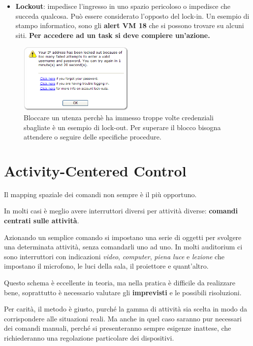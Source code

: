 \begin{itemize}
	\item \textbf{Lockout}: impedisce l'ingresso in uno spazio pericoloso o impedisce che succeda qualcosa. Può essere considerato l'opposto del lock-in. Un esempio di stampo informatico, sono gli \textbf{alert VM 18} che si possono trovare su alcuni siti. \textbf{Per accedere ad un task si deve compiere un'azione.}
\end{itemize}

	\begin{figure}[!h]
	\centering
	\includegraphics[width=0.5\textwidth]{src/immagini/lockout.png}
	\caption{Bloccare un utenza perchè ha immesso troppe volte credenziali sbagliate è un esempio di lock-out. Per superare il blocco bisogna attendere o seguire delle specifiche procedure.}
\end{figure}



\section{Activity-Centered Control}
Il mapping spaziale dei comandi non sempre è il più opportuno.

In molti casi è meglio avere interruttori diversi per attività diverse: \textbf{comandi centrati sulle attività}.

Azionando un semplice comando si impostano una serie di oggetti per svolgere una determinata attività, senza comandarli uno ad uno. In molti auditorium ci sono interruttori con indicazioni \textit{video}, \textit{computer}, \textit{piena luce} e \textit{lezione} che impostano il microfono, le luci della sala, il proiettore e quant'altro.

Questo schema è eccellente in teoria, ma nella pratica è difficile da realizzare bene, soprattutto è necessario valutare gli \textbf{imprevisti} e le possibili risoluzioni.

Per carità, il metodo è giusto, purché la gamma di attività sia scelta in modo da corrispondere alle situazioni reali. Ma anche in quel caso saranno pur necessari dei comandi manuali, perché si presenteranno sempre esigenze inattese, che richiederanno una regolazione particolare dei dispositivi.

